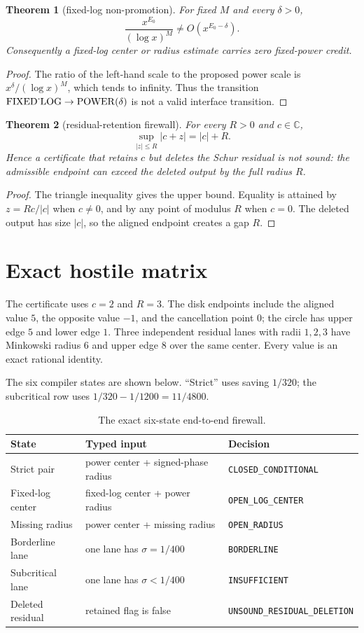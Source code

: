 \documentclass[11pt]{article}
\newtheorem{theorem}{Theorem}
\theoremstyle{definition}
\newcommand{\C}{\mathbb C}
\newcommand{\Pow}{\mathrm{POWER}}
\newcommand{\LogType}{\mathrm{FIXED\mathchar`\_LOG}}
\begin{document}
\begin{theorem}[fixed-log non-promotion]
For fixed $M$ and every $\delta>0$,
\[
 \frac{x^{E_0}}{(\log x)^M}\not=O(x^{E_0-\delta}).
\]
Consequently a fixed-log center or radius estimate carries zero fixed-power
credit.
\end{theorem}

\begin{proof}
The ratio of the left-hand scale to the proposed power scale is
$x^\delta/(\log x)^M$, which tends to infinity.  Thus the transition
$\LogType\to\Pow(\delta)$ is not a valid interface transition.
\end{proof}

\begin{theorem}[residual-retention firewall]
For every $R>0$ and $c\in\C$,
\[
 \sup_{|z|\leq R}|c+z|=|c|+R.
\]
Hence a certificate that retains $c$ but deletes the Schur residual is not
sound: the admissible endpoint can exceed the deleted output by the full
radius $R$.
\end{theorem}

\begin{proof}
The triangle inequality gives the upper bound.  Equality is attained by
$z=Rc/|c|$ when $c\neq0$, and by any point of modulus $R$ when $c=0$.
The deleted output has size $|c|$, so the aligned endpoint creates a gap $R$.
\end{proof}

\section{Exact hostile matrix}

The certificate uses $c=2$ and $R=3$.  The disk endpoints include the aligned
value $5$, the opposite value $-1$, and the cancellation point $0$; the
circle has upper edge $5$ and lower edge $1$.  Three independent residual
lanes with radii $1,2,3$ have Minkowski radius $6$ and upper edge $8$ over the
same center.  Every value is an exact rational identity.

The six compiler states are shown below.  ``Strict'' uses saving $1/320$;
the subcritical row uses $1/320-1/1200=11/4800$.
\begin{table}[ht]
\centering
\begin{tabular}{lll}
\toprule
State & Typed input & Decision\\
\midrule
Strict pair & power center + signed-phase radius & \texttt{CLOSED\_CONDITIONAL}\\
Fixed-log center & fixed-log center + power radius & \texttt{OPEN\_LOG\_CENTER}\\
Missing radius & power center + missing radius & \texttt{OPEN\_RADIUS}\\
Borderline lane & one lane has $\sigma=1/400$ & \texttt{BORDERLINE}\\
Subcritical lane & one lane has $\sigma<1/400$ & \texttt{INSUFFICIENT}\\
Deleted residual & retained flag is false & \texttt{UNSOUND\_RESIDUAL\_DELETION}\\
\bottomrule
\end{tabular}
\caption{The exact six-state end-to-end firewall.}
\label{tab:matrix}
\end{table}
\end{document}
